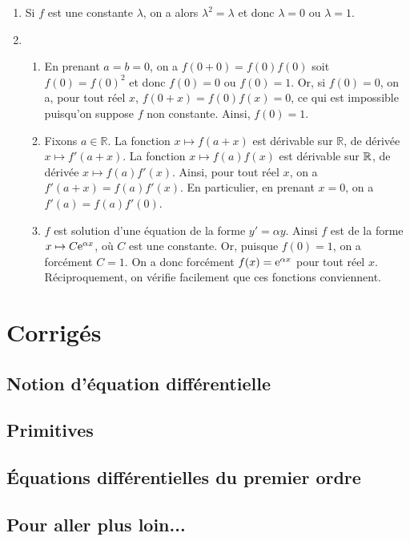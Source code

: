 \documentclass[11pt,fleqn, openany]{book} %
\begin{document}
\begin{solution}\hspace{0pt}

\begin{enumerate}
\item Si $f$ est une constante $\lambda$, on a alors $\lambda ^2 = \lambda$ et donc $\lambda=0$ ou $\lambda = 1$.
\item \begin{enumerate}
\item En prenant $a=b=0$, on a $f(0+0)=f(0)f(0)$ soit $f(0)=f(0)^2$ et donc $f(0)=0$ ou $f(0)=1$. Or, si $f(0)=0$, on a, pour tout réel $x$, $f(0+x)=f(0)f(x)=0$, ce qui est impossible puisqu'on suppose $f$ non constante. Ainsi, $f(0)=1$.
\item Fixons $a\in\mathbb{R}$. La fonction $x\mapsto f(a+x)$ est dérivable sur $\mathbb{R}$, de dérivée $x\mapsto f'(a+x)$. La fonction $x\mapsto f(a)f(x)$ est dérivable sur $\mathbb{R}$, de dérivée $x\mapsto f(a)f'(x)$. Ainsi, pour tout réel $x$, on a $f'(a+x)=f(a)f'(x)$. En particulier, en prenant $x=0$, on a $f'(a)=f(a)f'(0)$.
\item $f$ est solution d'une équation de la forme $y'=\alpha y$. Ainsi $f$ est de la forme $x\mapsto C\mathrm{e}^{\alpha x}$, où $C$ est une constante. Or, puisque $f(0)=1$, on a forcément $C=1$. On a donc forcément $f(x)=\mathrm{e}^{\alpha x}$ pour tout réel $x$. Réciproquement, on vérifie facilement que ces fonctions conviennent.
\end{enumerate}
\end{enumerate}

\end{solution}


\chapter{Corrigés}


\section*{Notion d'équation différentielle}

\printsolutions[collection={diff01}, headings={false} ]
\section*{Primitives}

\printsolutions[collection={diff02}, headings={false} ]

\section*{Équations différentielles du premier ordre}

\printsolutions[collection={diff03}, headings={false} ]

\section*{Pour aller plus loin...}

\printsolutions[collection={diff04}, headings={false} ]
\end{document}
